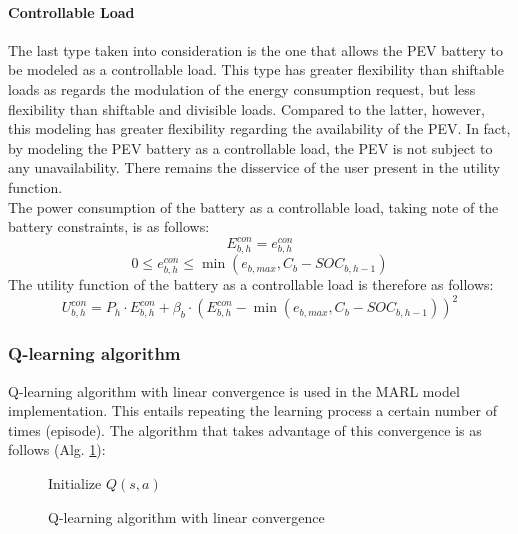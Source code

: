 \paragraph{Controllable Load}
The last type taken into consideration is the one that allows the PEV battery to be modeled as a controllable load. This type has greater flexibility than shiftable loads as regards the modulation of the energy consumption request, but less flexibility than shiftable and divisible loads. Compared to the latter, however, this modeling has greater flexibility regarding the availability of the PEV. In fact, by modeling the PEV battery as a controllable load, the PEV is not subject to any unavailability. There remains the disservice of the user present in the utility function.\\
The power consumption of the battery as a controllable load, taking note of the battery constraints, is as follows:
\begin{equation}
E^{con}_{b,h} = e^{con}_{b,h}
\end{equation}
\begin{equation}
0 \leq e^{con}_{b,h} \leq \min(e_{b,max}, C_b - SOC_{b,h-1})
\end{equation}
The utility function of the battery as a controllable load is therefore as follows:
\begin{equation}
    U^{con}_{b,h} = P_h \cdot E^{con}_{b,h} + \beta_b \cdot (E^{con}_{b,h} - \min(e_{b,max}, C_b - SOC_{b,h-1}))^2
\end{equation}


\subsubsection{Q-learning algorithm}
Q-learning algorithm with linear convergence is used in the MARL model implementation. This entails repeating the learning process a certain number of times (episode). The algorithm that takes advantage of this convergence is as follows (Alg. \ref{alg:2}):

\begin{figure}[ht]
    \centering
    \begin{minipage}{\linewidth}
        \begin{algorithm}[H]
        \label{alg:2}
            \SetAlgoLined
            Initialize $Q(s,a)$\;
            \caption{Q-learning algorithm with linear convergence}
        \end{algorithm}
    \end{minipage}
\end{figure}


